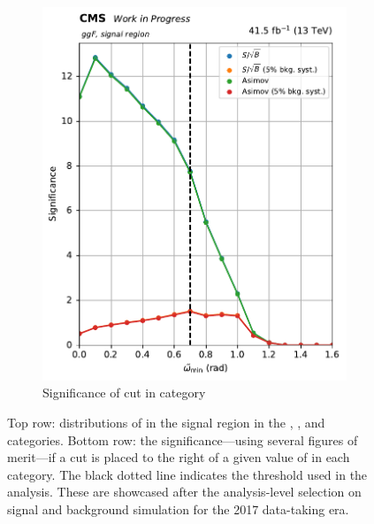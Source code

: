 \begin{figure}[htbp]
\begin{subfigure}[b]{0.27\textwidth}
        \includegraphics[width=\textwidth]{figures/category_optimisations/significance_ggF_min_omega_tilde_all.pdf}
        \caption{Significance of cut in \ggF category}
    \end{subfigure}
    \caption[Distributions of \omegaTilde in the signal region in the \ttH, \VH, and \ggF categories, along with the significance---using several figures of merit---if a cut is placed to the right of a given value]{Top row: distributions of \omegaTilde in the signal region in the \ttH, \VH, and \ggF categories. Bottom row: the significance---using several figures of merit---if a cut is placed to the right of a given value of \omegaTilde in each category. The black dotted line indicates the threshold used in the analysis. These are showcased after the analysis-level selection on signal and background simulation for the 2017 data-taking era.}
    \label{fig:htoinv_category_optimisations_significances}
\end{figure}


